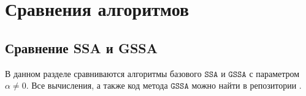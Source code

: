 \documentclass[12pt, specialist, subf
]{disser}
\theoremstyle{definition}
\newcommand{\SSA}{\texttt{SSA}}
\newcommand{\GSSA}{\texttt{GSSA}}
\newtheorem{theorem}{Теорема} %
\begin{document}






\newpage




\chapter{Сравнения алгоритмов}
\label{chapter:comparison}


\section{Сравнение SSA и GSSA}
\label{sec:compare_ssa_gssa}
В данном разделе сравниваются алгоритмы базового $\SSA$ и $\GSSA$ с параметром $\alpha \not = 0$. Все вычисления, а также код метода $\GSSA$ можно найти в репозитории \cite{spbu_cissa_coursework_github}.
\end{document}
